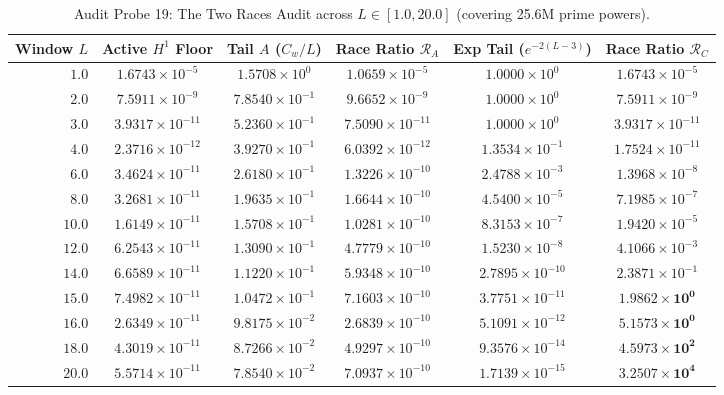 \documentclass[11pt,a4paper]{article}
\begin{document}
\begin{table}[htbp]
\centering
\small
\caption{Audit Probe 19: The Two Races Audit across $L \in [1.0, 20.0]$ (covering 25.6M prime powers).}
\label{tab:two_races_audit}
\begin{tabular}{rccccc}
\hline
Window $L$ & Active $H^1$ Floor & Tail $A$ ($C_w/L$) & Race Ratio $\mathcal{R}_A$ & Exp Tail ($e^{-2(L-3)}$) & Race Ratio $\mathcal{R}_C$ \\
\hline
$1.0$ & $1.6743 \times 10^{-5}$ & $1.5708 \times 10^{0}$ & $1.0659 \times 10^{-5}$ & $1.0000 \times 10^{0}$ & $1.6743 \times 10^{-5}$ \\
$2.0$ & $7.5911 \times 10^{-9}$ & $7.8540 \times 10^{-1}$ & $9.6652 \times 10^{-9}$ & $1.0000 \times 10^{0}$ & $7.5911 \times 10^{-9}$ \\
$3.0$ & $3.9317 \times 10^{-11}$ & $5.2360 \times 10^{-1}$ & $7.5090 \times 10^{-11}$ & $1.0000 \times 10^{0}$ & $3.9317 \times 10^{-11}$ \\
$4.0$ & $2.3716 \times 10^{-12}$ & $3.9270 \times 10^{-1}$ & $6.0392 \times 10^{-12}$ & $1.3534 \times 10^{-1}$ & $1.7524 \times 10^{-11}$ \\
$6.0$ & $3.4624 \times 10^{-11}$ & $2.6180 \times 10^{-1}$ & $1.3226 \times 10^{-10}$ & $2.4788 \times 10^{-3}$ & $1.3968 \times 10^{-8}$ \\
$8.0$ & $3.2681 \times 10^{-11}$ & $1.9635 \times 10^{-1}$ & $1.6644 \times 10^{-10}$ & $4.5400 \times 10^{-5}$ & $7.1985 \times 10^{-7}$ \\
$10.0$ & $1.6149 \times 10^{-11}$ & $1.5708 \times 10^{-1}$ & $1.0281 \times 10^{-10}$ & $8.3153 \times 10^{-7}$ & $1.9420 \times 10^{-5}$ \\
$12.0$ & $6.2543 \times 10^{-11}$ & $1.3090 \times 10^{-1}$ & $4.7779 \times 10^{-10}$ & $1.5230 \times 10^{-8}$ & $4.1066 \times 10^{-3}$ \\
$14.0$ & $6.6589 \times 10^{-11}$ & $1.1220 \times 10^{-1}$ & $5.9348 \times 10^{-10}$ & $2.7895 \times 10^{-10}$ & $2.3871 \times 10^{-1}$ \\
$15.0$ & $7.4982 \times 10^{-11}$ & $1.0472 \times 10^{-1}$ & $7.1603 \times 10^{-10}$ & $3.7751 \times 10^{-11}$ & $\mathbf{1.9862 \times 10^{0}}$ \\
$16.0$ & $2.6349 \times 10^{-11}$ & $9.8175 \times 10^{-2}$ & $2.6839 \times 10^{-10}$ & $5.1091 \times 10^{-12}$ & $\mathbf{5.1573 \times 10^{0}}$ \\
$18.0$ & $4.3019 \times 10^{-11}$ & $8.7266 \times 10^{-2}$ & $4.9297 \times 10^{-10}$ & $9.3576 \times 10^{-14}$ & $\mathbf{4.5973 \times 10^{2}}$ \\
$20.0$ & $5.5714 \times 10^{-11}$ & $7.8540 \times 10^{-2}$ & $7.0937 \times 10^{-10}$ & $1.7139 \times 10^{-15}$ & $\mathbf{3.2507 \times 10^{4}}$ \\
\hline
\end{tabular}
\end{table}
\end{document}
